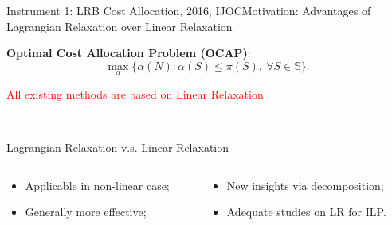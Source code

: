 \documentclass[14pt]{beamer}
\begin{document}
\begin{frame}{Instrument 1: LRB Cost Allocation, {\footnotesize 2016, IJOC}}{Motivation: Advantages of Lagrangian Relaxation over Linear Relaxation}
\vspace{-5mm}
\small
\begin{shaded}
\centering
{\bf Optimal Cost Allocation Problem (OCAP)}:
\begin{equation*}
\max_{\alpha}\big\{ \alpha(N):\alpha(S) \leq \pi(S), ~\forall S \in \mathbb{S} \big\}.
\end{equation*}
\vspace{-2em}
\end{shaded}

\textcolor{red}{\bf \centerline{All existing methods are based on Linear Relaxation}}\\
\vspace{-2mm}
\begin{shaded}
\centering
Lagrangian Relaxation v.s. Linear Relaxation
\end{shaded}
\vspace{-5mm}
\begin{columns}
\begin{column}{5.5cm}
\begin{itemize}
\footnotesize
\item Applicable in non-linear case;
\item Generally more effective;
\end{itemize}
\end{column}
\begin{column}{8cm}
\begin{itemize}
\footnotesize
\item New insights via decomposition;
\item Adequate studies on LR for ILP.
\end{itemize}
\end{column}
\end{columns}

\end{frame}
\end{document}
